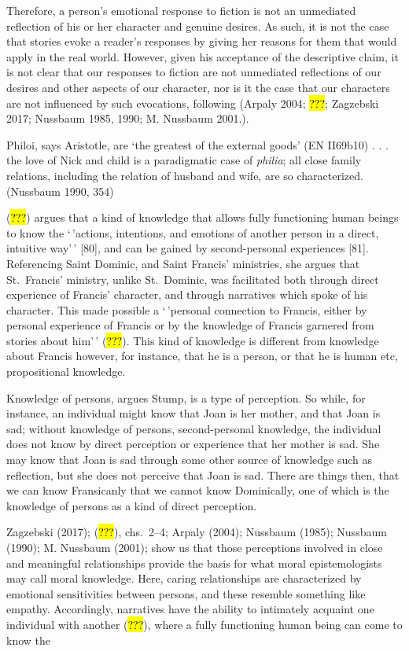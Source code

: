 \documentclass[
  letterpaper,
  DIV=11,
  numbers=noendperiod]{scrartcl}
\theoremstyle{remark}
\begin{document}
Therefore, a person's emotional response to fiction is not an unmediated
reflection of his or her character and genuine desires. As such, it is
not the case that stories evoke a reader's responses by giving her
reasons for them that would apply in the real world. However, given his
acceptance of the descriptive claim, it is not clear that our responses
to fiction are not unmediated reflections of our desires and other
aspects of our character, nor is it the case that our characters are not
influenced by such evocations, following (Arpaly 2004; \hl{???};
Zagzebski 2017; Nussbaum 1985, 1990; M. Nussbaum 2001.).

Philoi, says Aristotle, are `the greatest of the external goods' (EN
II69b10) . . . the love of Nick and child is a paradigmatic case of
\emph{philia}; all close family relations, including the relation of
husband and wife, are so characterized. (Nussbaum 1990, 354)

(\hl{???}) argues that a kind of knowledge that allows fully functioning
human beings to know the `\,'actions, intentions, and emotions of
another person in a direct, intuitive way'\,' {[}80{]}, and can be
gained by second-personal experiences {[}81{]}. Referencing Saint
Dominic, and Saint Francis' ministries, she argues that St.~Francis'
ministry, unlike St.~Dominic, was facilitated both through direct
experience of Francis' character, and through narratives which spoke of
his character. This made possible a `\,'personal connection to Francis,
either by personal experience of Francis or by the knowledge of Francis
garnered from stories about him'\,' (\hl{???}). This kind of knowledge
is different from knowledge about Francis however, for instance, that he
is a person, or that he is human etc, propositional knowledge.

Knowledge of persons, argues Stump, is a type of perception. So while,
for instance, an individual might know that Joan is her mother, and that
Joan is sad; without knowledge of persons, second-personal knowledge,
the individual does not know by direct perception or experience that her
mother is sad. She may know that Joan is sad through some other source
of knowledge such as reflection, but she does not perceive that Joan is
sad. There are things then, that we can know Fransicanly that we cannot
know Dominically, one of which is the knowledge of persons as a kind of
direct perception.

Zagzebski (2017); (\hl{???}), chs.~2--4; Arpaly (2004); Nussbaum (1985);
Nussbaum (1990); M. Nussbaum (2001); show us that those perceptions
involved in close and meaningful relationships provide the basis for
what moral epistemologists may call moral knowledge. Here, caring
relationships are characterized by emotional sensitivities between
persons, and these resemble something like empathy. Accordingly,
narratives have the ability to intimately acquaint one individual with
another (\hl{???}), where a fully functioning human being can come to
know the
\end{document}
